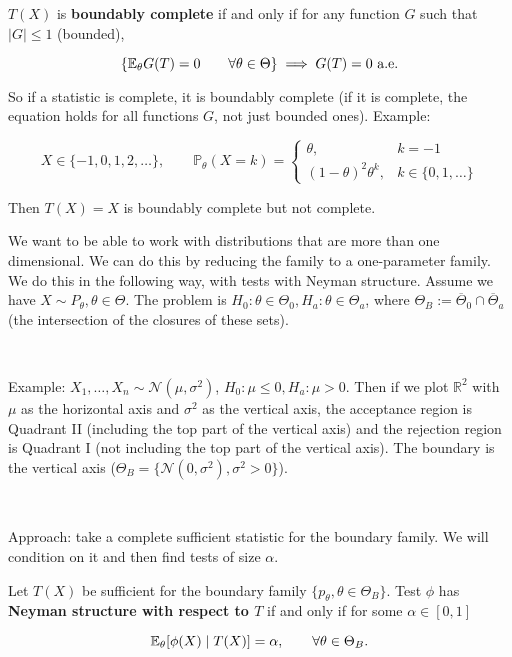 \begin{definition}

\(T(X)\) is \textbf{boundably complete} if and only if for any function \(G\) such that \(|G| \leq 1\) (bounded), 

\[
 \left\{ \E_\theta G(T) = 0 \qquad \forall \theta \in \Theta \right\} \implies G(T) = 0 \text{ a.e.}
\] 

\end{definition}

So if a statistic is complete, it is boundably complete (if it is complete, the equation holds for all functions \(G\), not just bounded ones). Example: 

\[
X \in \{-1, 0, 1, 2, \ldots \}, \qquad
\mathbb{P}_\theta(X = k) = \begin{cases}
 \theta, & k = -1 \\
(1 - \theta)^2 \theta^k, & k \in \{0, 1, \ldots\}
\end{cases}
\]

Then \(T(X) = X\) is boundably complete but not complete.

We want to be able to work with distributions that are more than one dimensional. We can do this by reducing the family to a one-parameter family. We do this in the following way, with tests with Neyman structure. Assume we have \(X \sim P_\theta, \theta \in \Theta\). The problem is \(H_0: \theta \in \Theta_0, H_a: \theta \in \Theta_a\), where \(\Theta_B := \overline{\Theta}_0 \cap \overline{\Theta}_a\) (the intersection of the closures of these sets). 

\

Example: \(X_1, \ldots, X_n \sim \mathcal{N}(\mu, \sigma^2)\), \(H_0: \mu \leq 0, H_a: \mu > 0\). Then if we plot \(\mathbb{R}^2\) with \(\mu\) as the horizontal axis and \(\sigma^2\) as the vertical axis, the acceptance region is Quadrant II (including the top part of the vertical axis) and the rejection region is Quadrant I (not including the top part of the vertical axis). The boundary is the vertical axis (\(\Theta_B = \{\mathcal{N}(0, \sigma^2), \sigma^2 > 0\}\)).

\

Approach: take a complete sufficient statistic for the boundary family. We will condition on it and then find tests of size \(\alpha\). 


\begin{definition}
Let \(T(X)\) be sufficient for the boundary family \(\{p_{\theta}, \theta \in \Theta_B\}\). Test \(\phi\) has \textbf{Neyman structure with respect to \(T\)} if and only if for some \(\alpha \in [0,1]\)

\[
\E_\theta [\phi(X) \mid T(X)] = \alpha, \qquad \forall \theta \in \Theta_B.
\]


\end{definition}

